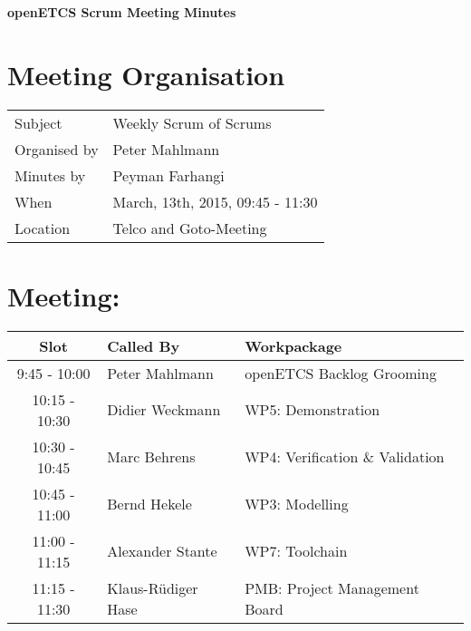 \documentclass[a4paper, 11pt]{article}
\begin{document}
{\begin{center}\huge\bf openETCS Scrum Meeting Minutes\end{center}}
\section{Meeting Organisation}

\renewcommand{\arraystretch}{1.5}
\begin{supertabular}{m{.2\textwidth}m{.8\textwidth}}
Subject & Weekly Scrum of Scrums\\
Organised by & Peter Mahlmann\\
Minutes by & Peyman Farhangi\\
When & March, 13th, 2015, 09:45 - 11:30\\
Location & Telco and Goto-Meeting\\
\end{supertabular}

\renewcommand{\arraystretch}{1.0}
\section{Meeting:}

\begin{tabular}{|c|l|l|}
\hline
\textbf{Slot} &  \textbf{Called By} & \textbf{Workpackage} \\
\hline  
9:45 - 10:00 & Peter Mahlmann & openETCS Backlog Grooming  \\\hline
10:15 - 10:30 & Didier Weckmann & WP5: Demonstration \\\hline  
10:30 - 10:45 & Marc Behrens & WP4: Verification \& Validation \\\hline  
10:45 - 11:00 & Bernd Hekele & WP3: Modelling \\\hline  
11:00 - 11:15 & Alexander Stante  & WP7: Toolchain \\\hline
11:15 - 11:30 & Klaus-R\"udiger Hase & PMB: Project Management Board \\\hline  
\end{tabular}
\end{document}
